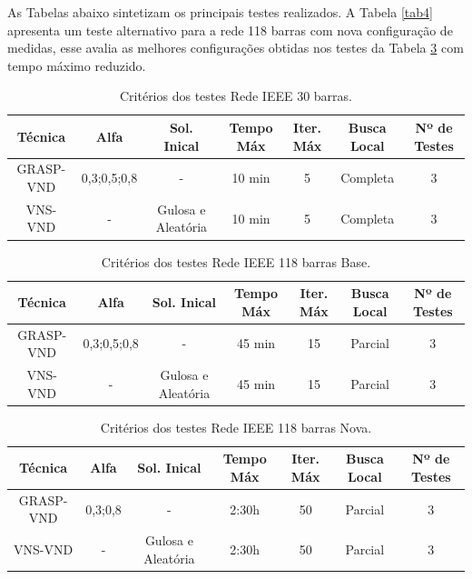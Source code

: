 \documentclass[12pt]{article}
\begin{document}
As Tabelas abaixo sintetizam os principais testes realizados. A Tabela \ref{tab4} apresenta um teste alternativo para a rede 118 barras com nova configuração de medidas, esse avalia as melhores configurações obtidas nos testes da Tabela \ref{tab3} com tempo máximo reduzido.


\begin{table}[H]
	\centering
	\caption{Critérios dos testes Rede IEEE 30 barras.}
	\begin{tabular}{|c|c|c|c|c|c|c|}
		\hline
		\textbf{Técnica} & \textbf{Alfa} & \textbf{Sol. Inical} & \textbf{Tempo Máx} & \textbf{Iter. Máx} & \textbf{Busca Local} & \textbf{Nº de Testes} \\
		\hline
		GRASP-VND & 0,3;0,5;0,8 & -     & 10 min & 5    & Completa & 3 \\
		\hline
		VNS-VND & -     & Gulosa e Aleatória & 10 min & 5    & Completa & 3 \\
		\hline
	\end{tabular}%
	\label{tab1}%
\end{table}%


\begin{table}[H]
	\centering
	\caption{Critérios dos testes Rede IEEE 118 barras Base.}
	\begin{tabular}{|c|c|c|c|c|c|c|}
		\hline
		\textbf{Técnica} & \textbf{Alfa} & \textbf{Sol. Inical} & \textbf{Tempo Máx} & \textbf{Iter. Máx} & \textbf{Busca Local} & \textbf{Nº de Testes} \\
		\hline
		GRASP-VND & 0,3;0,5;0,8 & -     & 45 min & 15    & Parcial & 3 \\
		\hline
		VNS-VND & -     & Gulosa e Aleatória & 45 min & 15    & Parcial & 3 \\
		\hline
	\end{tabular}%
	\label{tab2}%
\end{table}%

\begin{table}[H]
	\centering
	\caption{Critérios dos testes Rede IEEE 118 barras Nova.}
	\begin{tabular}{|c|c|c|c|c|c|c|}
		\hline
		\textbf{Técnica} & \textbf{Alfa} & \textbf{Sol. Inical} & \textbf{Tempo Máx} & \textbf{Iter. Máx} & \textbf{Busca Local} & \textbf{Nº de Testes} \\
		\hline
		GRASP-VND & 0,3;0,8   & -     & 2:30h & 50    & Parcial & 3 \\
		\hline
		VNS-VND & -     & Gulosa e Aleatória & 2:30h & 50    & Parcial & 3 \\
		\hline
	\end{tabular}%
	\label{tab3}%
\end{table}%
\end{document}
